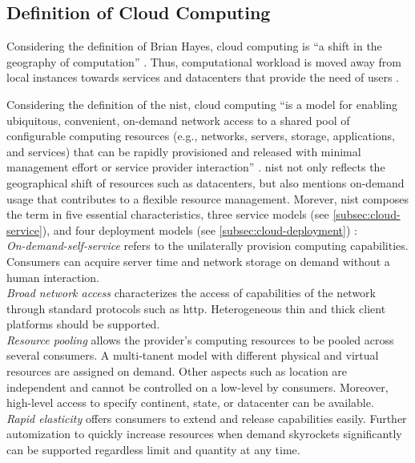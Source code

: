 \subsection{Definition of Cloud Computing}

Considering the definition of Brian Hayes, cloud computing is \enquote{a shift in the geography of computation} \cite{hayes2008}. Thus, computational workload is moved away from local instances towards services and datacenters that provide the need of users \cite{Armbrust2010}.

Considering the definition of the \ac{nist}, cloud computing \enquote{is a model for enabling ubiquitous, convenient, on-demand network access to a shared pool of configurable computing resources (e.g., networks, servers, storage, applications, and services) that can be rapidly provisioned and released with minimal management effort or service provider interaction} \cite{Mell2011}. \ac{nist} not only reflects the geographical shift of resources such as datacenters, but also mentions on-demand usage that contributes to a flexible resource management. Morever, \ac{nist} composes the term in five essential characteristics, three service models (see \autoref{subsec:cloud-service}), and four deployment models (see \autoref{subsec:cloud-deployment}) \cite{Mell2011}:\\

\textit{On-demand-self-service} refers to the unilaterally provision computing capabilities. Consumers can acquire server time and network storage on demand without a human interaction.\\

\textit{Broad network access} characterizes the access of capabilities of the network through standard protocols such as \ac{http}. Heterogeneous thin and thick client platforms should be supported.\\

\textit{Resource pooling} allows the provider's computing resources to be pooled across several consumers. A multi-tanent model with different physical and virtual resources are assigned on demand. Other aspects such as location are independent and cannot be controlled on a low-level by consumers. Moreover, high-level access to specify continent, state, or datacenter can be available.\\

\textit{Rapid elasticity} offers consumers to extend and release capabilities easily. Further automization to quickly increase resources  when demand skyrockets significantly can be supported regardless limit and quantity at any time.\\

